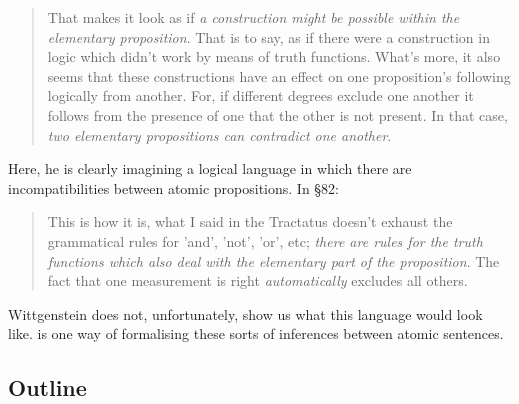 \begin{quote}
  That makes it look as if \emph{a construction might be possible
    within the elementary proposition}. That is to say, as if there
  were a construction in logic which didn't work by means of truth
  functions.  What's more, it also seems that these constructions have
  an effect on one proposition's following logically from another.
  For, if different degrees exclude one another it follows from the
  presence of one that the other is not present.  In that case,
  \emph{two elementary propositions can contradict one another}.
\end{quote}

\NI Here, he is clearly imagining a logical language in which there
are incompatibilities between atomic propositions. In \S 82:

\begin{quote}
  This is how it is, what I said in the Tractatus doesn't exhaust the
  grammatical rules for 'and', 'not', 'or', etc; \emph{there are rules
    for the truth functions which also deal with the elementary part
    of the proposition}.  The fact that one measurement is right
  \emph{automatically} excludes all others.
\end{quote}

\NI Wittgenstein does not, unfortunately, show us what this
language would look like.  \Cathoristic{} is one way of formalising these sorts of inferences
between atomic sentences.

\subsection{Outline}

